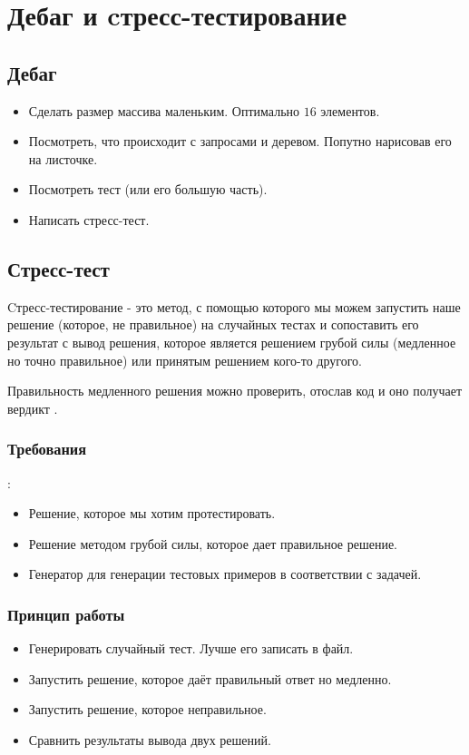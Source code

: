 {\section{Дебаг и cтресс-тестирование}
\subsection{Дебаг}

\up \up
\begin{itemize}
	\item Сделать размер массива маленьким. Оптимально $16$ элементов.
	\item Посмотреть, что происходит с запросами и деревом. Попутно нарисовав его на листочке.
	\item Посмотреть тест (или его большую часть).
	\item Написать стресс-тест.
\end{itemize} \up \up

\subsection{Стресс-тест}

Cтресс-тестирование - это метод, с помощью которого мы можем запустить наше решение (которое, не правильное) на случайных тестах и сопоставить его результат с вывод решения, которое является решением грубой силы (медленное но точно правильное) или принятым решением кого-то другого.

Правильность медленного решения можно проверить, отослав код и оно получает вердикт .

\subsubsection{Требования}:
\up
\begin{itemize}
	\item Решение, которое мы хотим протестировать.
	\item Решение методом грубой силы, которое дает правильное решение.
	\item Генератор для генерации тестовых примеров в соответствии с задачей.
\end{itemize} \up \up

\subsubsection{Принцип работы}

\up \up
\begin{itemize}
	\item Генерировать случайный тест. Лучше его записать в файл.
	\item Запустить решение, которое даёт правильный ответ но медленно.
	\item Запустить решение, которое неправильное.
	\item Сравнить результаты вывода двух решений.
\end{itemize} \up \up

}
